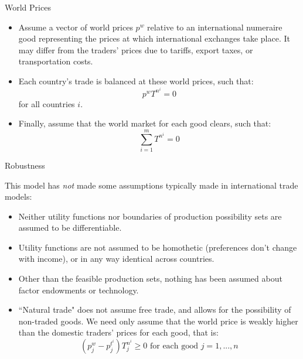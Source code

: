 \documentclass[aspectratio=169]{beamer}
\begin{document}

\begin{frame}{World Prices}

\begin{itemize}
    \item<1-> Assume a vector of world prices $ p^{w} $ relative to an international numeraire good representing the prices at which international exchanges take place.  It may differ from the traders’ prices due to tariffs, export taxes, or transportation costs.
    \item<2-> Each country’s trade is balanced at these world prices, such that:
    \begin{equation}
        p^{w} T^{n^{i}} = 0
        \label{eq:balancedtrade}
    \end{equation}
    for all countries $ i $.
    \item<3-> Finally, assume that the world market for each good clears, such that:
    \begin{equation}
        \sum_{i=1}^{m} T^{n^{i}} = 0
        \label{eq:worldmarketsclear}
    \end{equation}
\end{itemize}
    
\end{frame}


\begin{frame}{Robustness}

This model has \emph{not} made some assumptions typically made in international trade models:
\begin{itemize}
    \item<1-> Neither utility functions nor boundaries of production possibility sets are assumed to be differentiable.
    \item<2-> Utility functions are not assumed to be homothetic (preferences don’t change with income), or in any way identical across countries.
    \item<3-> Other than the feasible production sets, nothing has been assumed about factor endowments or technology.
    \item<4-> ``Natural trade" does not assume free trade, and allows for the possibility of non-traded goods.  We need only assume that the world price is weakly higher than the domestic traders’ prices for each good, that is:
    \begin{equation}
        \left( p_{j}^{w} - p_{j}^{t^{i}} \right) T_{j}^{n^{i}} \ge 0 \text{ for each good } j = 1,...,n
        \label{eq:naturaltradedef}
    \end{equation}
\end{itemize}
    
\end{frame}
\end{document}
